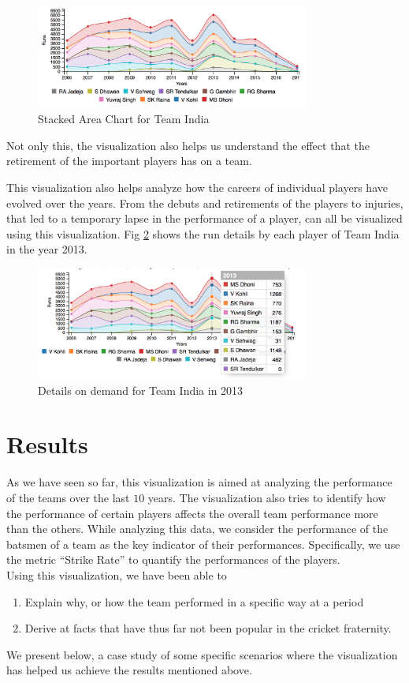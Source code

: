 \documentclass[10pt,journal,compsoc]{IEEEtran}
\begin{document}
\begin{figure}[ht]
\includegraphics[width=9cm]{stacked_area_chart.png}
\caption{Stacked Area Chart for Team India}
\label{fig:stacked_area_chart}
\end{figure}

\indent Not only this, the visualization also helps us understand the effect that the retirement of the important players has on a team.

\indent This visualization also helps analyze how the careers of individual players have evolved over the years. From the debuts and retirements of the players to injuries, that led to a temporary lapse in the performance of a player, can all be visualized using this visualization. Fig \ref{fig:stacked_area_details} shows the run details by each player of Team India in the year 2013.

\begin{figure}[ht]
\includegraphics[width=9cm]{stacked_area_details.png}
\caption{Details on demand for Team India in 2013}
\label{fig:stacked_area_details}
\end{figure}

\section {Results}
As we have seen so far, this visualization is aimed at analyzing the performance of the teams over the last $10$ years. The visualization also tries to identify how the performance of certain players affects the overall team performance more than the others. While analyzing this data, we consider the performance of the batsmen of a team as the key indicator of their performances. Specifically, we use the metric ``Strike Rate'' to quantify the performances of the players. \\
Using this visualization, we have been able to 
\begin{enumerate}
\item Explain why, or how the team performed in a specific way at a period 
\item Derive at facts that have thus far not been popular in the cricket fraternity. 
\end{enumerate}
We present below, a case study of some specific scenarios where the visualization has helped us achieve the results mentioned above.
\end{document}
